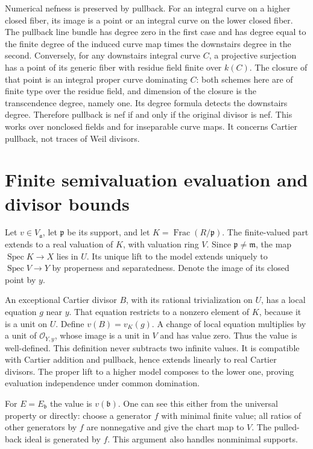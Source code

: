\documentclass[11pt]{article}
\begin{document}
Numerical nefness is preserved by pullback. For an integral curve on a higher closed fiber, its image is a point or an integral curve on the lower closed fiber. The pullback line bundle has degree zero in the first case and has degree equal to the finite degree of the induced curve map times the downstairs degree in the second. Conversely, for any downstairs integral curve \(C\), a projective surjection has a point of its generic fiber with residue field finite over \(k(C)\). The closure of that point is an integral proper curve dominating \(C\): both schemes here are of finite type over the residue field, and dimension of the closure is the transcendence degree, namely one. Its degree formula detects the downstairs degree. Therefore pullback is nef if and only if the original divisor is nef. This works over nonclosed fields and for inseparable curve maps. It concerns Cartier pullback, not traces of Weil divisors.

\section{Finite semivaluation evaluation and divisor bounds}

Let \(v\in V_{\mathfrak a}\), let \(\mathfrak p\) be its support, and let \(K=\operatorname{Frac}(R/\mathfrak p)\). The finite-valued part extends to a real valuation of \(K\), with valuation ring \(V\). Since \(\mathfrak p\ne\mathfrak m\), the map \(\operatorname{Spec}K\to X\) lies in \(U\). Its unique lift to the model extends uniquely to \(\operatorname{Spec}V\to Y\) by properness and separatedness. Denote the image of its closed point by \(y\).

An exceptional Cartier divisor \(B\), with its rational trivialization on \(U\), has a local equation \(g\) near \(y\). That equation restricts to a nonzero element of \(K\), because it is a unit on \(U\). Define \(v(B)=v_K(g)\). A change of local equation multiplies by a unit of \(\mathcal O_{Y,y}\), whose image is a unit in \(V\) and has value zero. Thus the value is well-defined. This definition never subtracts two infinite values. It is compatible with Cartier addition and pullback, hence extends linearly to real Cartier divisors. The proper lift to a higher model composes to the lower one, proving evaluation independence under common domination.

For \(E=E_{\mathfrak b}\) the value is \(v(\mathfrak b)\). One can see this either from the universal property or directly: choose a generator \(f\) with minimal finite value; all ratios of other generators by \(f\) are nonnegative and give the chart map to \(V\). The pulled-back ideal is generated by \(f\). This argument also handles nonminimal supports.
\end{document}

